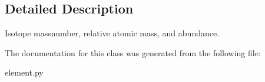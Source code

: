 \subsection{Detailed Description}
\begin{DoxyVerb}Isotope massnumber, relative atomic mass, and abundance.\end{DoxyVerb}
 

The documentation for this class was generated from the following file\+:\begin{DoxyCompactItemize}
\item 
element.\+py\end{DoxyCompactItemize}

